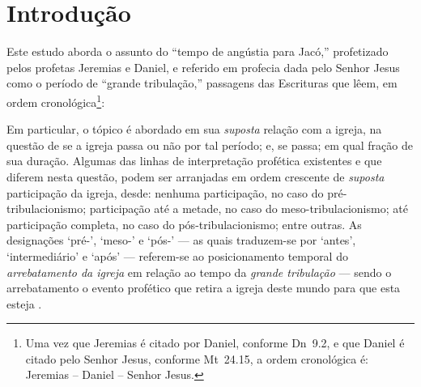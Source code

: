 \tableofcontents



\section{Introdução}

    Este estudo aborda o assunto do ``tempo de angústia para Jacó,'' profetizado pelos profetas Jeremias e Daniel, e referido em
    profecia dada pelo Senhor Jesus como o período de ``grande  tribulação,''  passagens  das  Escrituras  que  lêem,  em  ordem
    cronológica\footnote{Uma vez que Jeremias é citado por Daniel, conforme Dn~9.2, e que Daniel é  citado  pelo  Senhor  Jesus,
    conforme Mt~24.15, a ordem cronológica é: Jeremias -- Daniel -- Senhor Jesus.}:




    Em particular, o tópico é abordado em sua \emph{suposta} relação com a igreja, na questão de se a igreja passa  ou  não  por
    tal período; e, se passa; em qual fração de sua duração. Algumas das linhas de  interpretação  profética  existentes  e  que
    diferem nesta questão, podem ser arranjadas em ordem crescente de \emph{suposta}  participação  da  igreja,  desde:  nenhuma
    participação, no caso do pré-tribulacionismo; participação até a metade, no caso do meso-tribulacionismo;  até  participação
    completa, no caso do pós-tribulacionismo; entre outras. As designações `pré-', `meso-' e `pós-' --- as quais traduzem-se por
    `antes', `intermediário' e `após' --- referem-se ao posicionamento temporal do \emph{arrebatamento da igreja} em relação  ao
    tempo da \emph{grande tribulação} --- sendo o arrebatamento o evento profético que retira a igreja deste mundo para que esta
    esteja .

